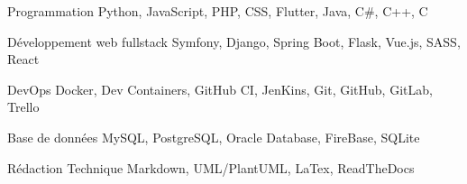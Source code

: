 

\begin{cvskills}

  \cvskill
    {Programmation} %
    {Python, JavaScript, PHP, CSS, Flutter, Java, C\#, C++, C} %

  \cvskill
    {Développement web fullstack} %
    {Symfony, Django, Spring Boot, Flask, Vue.js, SASS, React} %

  \cvskill
    {DevOps} %
    {Docker, Dev Containers, GitHub CI, JenKins, Git, GitHub, GitLab, Trello} %

  \cvskill
    {Base de données} %
    {MySQL, PostgreSQL, Oracle Database, FireBase, SQLite} %

  \cvskill
    {Rédaction Technique} %
    {Markdown, UML/PlantUML, LaTex, ReadTheDocs} %

\end{cvskills}
